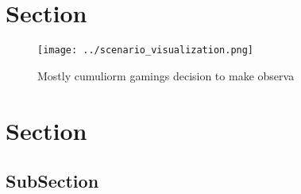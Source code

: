 \documentclass[a4paper]{article}
\begin{document}
\section{Section}

\begin{figure}
\centering
\texttt{[image: ../scenario\_visualization.png]}
\caption{Mostly cumuliorm gamings decision to make observa
}
\end{figure}
 
\section{Section}

\subsection{SubSection}
\end{document}
